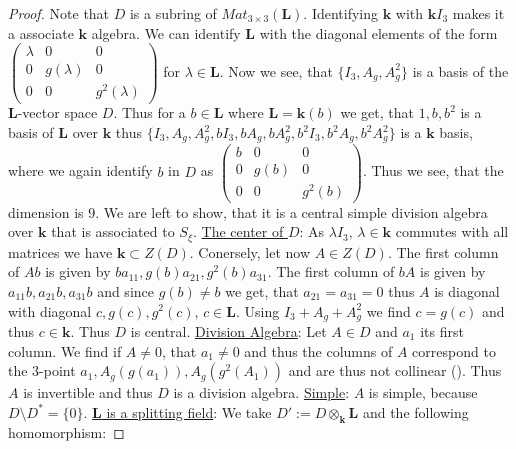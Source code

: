 \documentclass[12pt, oneside, reqno]{amsart}
\begin{document}
\begin{proof}
    Note that $D$ is a subring of $Mat_{3 \times 3}(\textbf{L})$. Identifying $\textbf{k}$ with $\textbf{k}I_3$ makes it a associate $\textbf{k}$ algebra.
     We can identify $\textbf{L}$ with the diagonal elements of the form $\begin{pmatrix}
         \lambda & 0 & 0 \\
         0 & g(\lambda) & 0 \\
         0 & 0 & g^2(\lambda) 
     \end{pmatrix}$ for $\lambda \in \textbf{L}$. Now we see, that $\{ I_3, A_g, A_g^2\}$ is a basis of the $\textbf{L}$-vector space $D$. Thus for a $b \in \textbf{L}$ where $\textbf{L} = \textbf{k}(b)$ we get, that $1,b,b^2$ is a basis of $\textbf{L}$ over $\textbf{k}$ thus $\{ I_3, A_g, A_g^2, bI_3, bA_g, bA_g^2,b^2I_3,b^2A_g,b^2A_g^2\}$ is a $\textbf{k}$ basis, where we again identify $b$ in $D$ as $\begin{pmatrix}
         b & 0 & 0 \\
         0 & g(b) & 0 \\
         0 & 0 & g^2(b) 
     \end{pmatrix}$. Thus we see, that the dimension is $9$. We are left to show, that it is a central simple division algebra over $\textbf{k}$ that is associated to $S_{\xi}$.
     \newline
     \underline{The center of $D$}: As $\lambda I_3, \, \lambda \in \textbf{k}$ commutes with all matrices we have $\textbf{k} \subset Z(D)$. Conersely, let now $A \in Z(D)$. The first column of $Ab$ is given by $ba_{11}, g(b)a_{21}, g^2(b)a_{31}$. The first column of $bA$ is given by $a_{11}b, a_{21}b, a_{31}b$ and since $g(b) \neq b$ we get, that $a_{21}=a_{31}=0$ thus $A$ is diagonal with diagonal $c,g(c),g^2(c), \, c \in \textbf{L}$. Using $I_3 + A_g + A_g^2$ we find $c=g(c)$ and thus $c \in \textbf{k}$. Thus $D$ is central.
     \newline
     \underline{Division Algebra}: Let $A \in D$ and $a_1$ its first column. We find if $A \neq 0$, that $a_1 \neq 0$ and thus the columns of $A$ correspond to the $3$-point $a_1, A_g(g(a_1)), A_g(g^2(A_1))$ and are thus not collinear (\cite[Proof of 2.3.2]{BSY}). Thus $A$ is invertible and thus $D$ is a division algebra.
     \newline
     \underline{Simple}: $A$ is simple, because $D \setminus D^* = \{ 0 \}$. 
     \newline
     \underline{\textbf{L} is a splitting field}: We take $D':= D \otimes_{\textbf{k}} \textbf{L}$ and the following homomorphism:

\end{proof}
\end{document}
